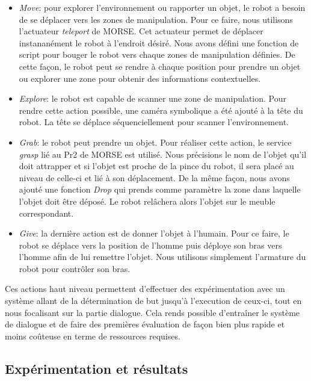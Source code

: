 \documentclass[a4paper,11pt,twoside]{StyleThese}
\begin{document}
\begin{itemize}

\item \textit{Move}: pour explorer l'environnement ou rapporter un objet, le robot a besoin de se déplacer vers les zones de manipulation. Pour ce faire, nous utilisons l'actuateur \textit{teleport} de MORSE. Cet actuateur permet de déplacer instananément le robot à l'endroit désiré. Nous avons défini une fonction de script pour bouger le robot vers chaque zones de manipulation définies. De cette façon, le robot peut se rendre à chaque position pour prendre un objet ou explorer une zone pour obtenir des informations contextuelles.

\item \textit{Explore}: le robot est capable de scanner une zone de manipulation. Pour rendre cette action possible, une caméra symbolique a été ajouté à la tête du robot. La tête se déplace séquenciellement pour scanner l'environnement.

\item \textit{Grab}: le robot peut prendre un objet. Pour réaliser cette action, le service \textit{grasp} lié au Pr2 de MORSE est utilisé. Nous précisions le nom de l'objet qu'il doit attrapper et si l'objet est proche de la pince du robot, il sera placé au niveau de celle-ci et lié à son déplacement. De la même façon, nous avons ajouté une fonction \textit{Drop} qui prends comme paramètre la zone dans laquelle l'objet doit être déposé. Le robot relâchera alors l'objet sur le meuble correspondant.

\item \textit{Give}: la dernière action est de donner l'objet à l'humain. Pour ce faire, le robot se déplace vers la position de l'homme puis déploye son bras vers l'homme afin de lui remettre l'objet. Nous utilisons simplement l'armature du robot pour contrôler son bras.
\end{itemize}

Ces actions haut niveau permettent d'effectuer des expérimentation avec un système allant de la détermination de but jusqu'à l'execution de ceux-ci, tout en nous focalisant sur la partie dialogue. Cela rends possible d'entraîner le système de dialogue et de faire des premières évaluation de façon bien plus rapide et moins coûteuse en terme de ressources requises.

\subsection{Expérimentation et résultats}
\end{document}
